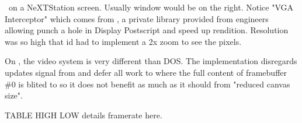 \doom~on a NeXTStation screen. Usually  window would be on the right. Notice "VGA Interceptor" which comes from , a private library provided from \NeXT engineers allowing punch a hole in Display Postscript and speed up rendition. Resolution was so high that id had to implement a 2x zoom to see the pixels.\\
\par
{}

\vspace{-4mm}
On \NeXT, the video system is very different than DOS. The implementation disregards updates signal from  and defer all work to  where the full content of framebuffer \#0 is blited to  so it does not benefit as much as it should from "reduced canvas size".\\
\par
TABLE HIGH LOW details framerate here.
